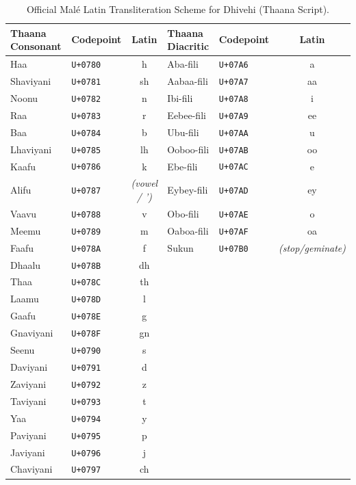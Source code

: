 \documentclass[acmsmall,review,anonymous]{acmart}
\begin{document}
\begin{table}[h]
\centering
\small
\caption{Official Mal\'{e} Latin Transliteration Scheme for Dhivehi (Thaana Script).}
\label{tab:transliteration}
\begin{tabular}{llcllc}
\toprule
\textbf{Thaana Consonant} & \textbf{Codepoint} & \textbf{Latin} & \textbf{Thaana Diacritic} & \textbf{Codepoint} & \textbf{Latin} \\
\midrule
Haa & \texttt{U+0780} & h & Aba-fili & \texttt{U+07A6} & a \\
Shaviyani & \texttt{U+0781} & sh & Aabaa-fili & \texttt{U+07A7} & aa \\
Noonu & \texttt{U+0782} & n & Ibi-fili & \texttt{U+07A8} & i \\
Raa & \texttt{U+0783} & r & Eebee-fili & \texttt{U+07A9} & ee \\
Baa & \texttt{U+0784} & b & Ubu-fili & \texttt{U+07AA} & u \\
Lhaviyani & \texttt{U+0785} & lh & Ooboo-fili & \texttt{U+07AB} & oo \\
Kaafu & \texttt{U+0786} & k & Ebe-fili & \texttt{U+07AC} & e \\
Alifu & \texttt{U+0787} & \textit{(vowel / ')} & Eybey-fili & \texttt{U+07AD} & ey \\
Vaavu & \texttt{U+0788} & v & Obo-fili & \texttt{U+07AE} & o \\
Meemu & \texttt{U+0789} & m & Oaboa-fili & \texttt{U+07AF} & oa \\
Faafu & \texttt{U+078A} & f & Sukun & \texttt{U+07B0} & \textit{(stop/geminate)} \\
Dhaalu & \texttt{U+078B} & dh & & & \\
Thaa & \texttt{U+078C} & th & & & \\
Laamu & \texttt{U+078D} & l & & & \\
Gaafu & \texttt{U+078E} & g & & & \\
Gnaviyani & \texttt{U+078F} & gn & & & \\
Seenu & \texttt{U+0790} & s & & & \\
Daviyani & \texttt{U+0791} & d & & & \\
Zaviyani & \texttt{U+0792} & z & & & \\
Taviyani & \texttt{U+0793} & t & & & \\
Yaa & \texttt{U+0794} & y & & & \\
Paviyani & \texttt{U+0795} & p & & & \\
Javiyani & \texttt{U+0796} & j & & & \\
Chaviyani & \texttt{U+0797} & ch & & & \\
\bottomrule
\end{tabular}
\end{table}
\end{document}

